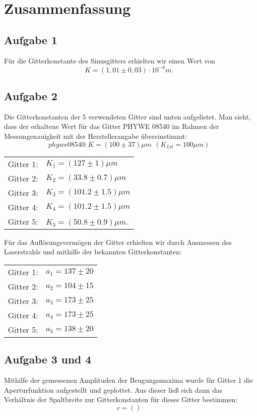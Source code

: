 \clearpage
\section{Zusammenfassung}
\subsection{Aufgabe 1}
Für die Gitterkonstante des Sinusgitters erhielten wir einen Wert von \[K=(1,01\pm0,03)\cdot 10^{-6}m.\]
\subsection{Aufgabe 2}
Die Gitterkonstanten der 5 verwendeten Gitter sind unten aufgelistet. Man sieht, dass der erhaltene Wert für das Gitter PHYWE 08540 im Rahmen der Messungenauigkeit mit der Herstellerangabe übereinstimmt:
\[phywe 08540: K=(100 \pm 37) \mu m ~~ (K_{Lit}=100 \mu m)\]
\begin{center}
\begin{tabular}{ll}
Gitter 1: & $K_1=(127 \pm 1)\mu m$\\
Gitter 2: & $K_2=(33.8 \pm 0.7) \mu m$\\
Gitter 3: & $K_3=(101.2 \pm 1.5) \mu m$\\
Gitter 4: & $K_4=(101.2 \pm 1.5) \mu m$\\
Gitter 5: & $K_5=(50.8 \pm 0.9) \mu m$.\\
\end{tabular}
\end{center}
Für das Auflösungsvermögen der Gitter erhielten wir durch Ausmessen des Laserstrahls und mithilfe der bekannten Gitterkonstanten:
\begin{center}
\begin{tabular}{ll}
Gitter 1: & $a_1=137 \pm 20$\\
Gitter 2: & $a_2=104 \pm 15$\\
Gitter 3: & $a_3=173 \pm 25$\\
Gitter 4: & $a_4=173 \pm 25$\\
Gitter 5: & $a_5=138 \pm 20$\\
\end{tabular}
\end{center}
\subsection{Aufgabe 3 und 4}
Mithilfe der gemessenen Amplituden der Beugungsmaxima wurde für Gitter 1 die Aperturfunktion aufgestellt und geplottet. Aus dieser ließ sich dann das Verhältnis der Spaltbreite zur Gitterkonstanten für dieses Gitter bestimmen: \[c=()\]
